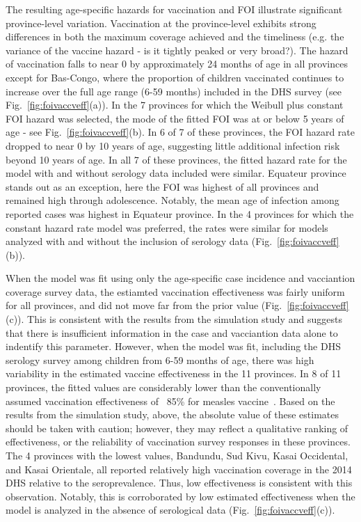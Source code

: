 \documentclass[nofootinbib,aps,pre,twocolumn,superscriptaddress,showkeys,showpacs]{revtex4-1}
\begin{document}
The resulting age-specific hazards for vaccination and FOI illustrate significant province-level variation.  Vaccination at the province-level exhibits strong differences in both the maximum coverage achieved and the timeliness (e.g. the variance of the vaccine hazard - is it tightly peaked or very broad?).  The hazard of vaccination falls to near 0 by approximately 24 months of age in all provinces except for Bas-Congo, where the proportion of children vaccinated continues to increase over the full age range (6-59 months) included in the DHS survey (see Fig.~\ref{fig:foivaccveff}(a)). In the 7 provinces for which the Weibull plus constant FOI hazard was selected, the mode of the fitted FOI was at or below 5 years of age - see Fig.~\ref{fig:foivaccveff}(b).  In 6 of 7 of these provinces, the FOI hazard rate dropped to near 0 by 10 years of age, suggesting little additional infection risk beyond 10 years of age.  In all 7 of these provinces, the fitted hazard rate for the model with and without serology data included were similar.  Equateur province stands out as an exception, here the FOI was highest of all provinces and remained high through adolescence. Notably, the mean age of infection among reported cases was highest in Equateur province. In the 4 provinces for which the constant hazard rate model was preferred, the rates were similar for models analyzed with and without the inclusion of serology data (Fig.~\ref{fig:foivaccveff}(b)).

When the model was fit using only the age-specific case incidence and vacciantion coverage survey data, the estiamted vaccination effectiveness was fairly uniform for all provinces, and did not move far from the prior value (Fig.~\ref{fig:foivaccveff}(c)).  This is consistent with the results from the simulation study and suggests that there is insufficient information in the case and vacciantion data alone to indentify this parameter.  However, when the model was fit, including the DHS serology survey among children from 6-59 months of age, there was high variability in the estimated vaccine effectiveness in the 11 provinces.  In 8 of 11 provinces, the fitted values are considerably lower than the conventionally assumed vaccination effectiveness of ~85\% for measles vaccine~\cite{Uzicanin2011}. Based on the results from the simulation study, above, the absolute value of these estimates should be taken with caution; however, they may reflect a qualitative ranking of effectiveness, or the reliability of vaccination survey responses in these provinces.  The 4 provinces with the lowest values, Bandundu, Sud Kivu, Kasai Occidental, and Kasai Orientale, all reported relatively high vaccination coverage in the 2014 DHS relative to the seroprevalence.  Thus, low effectiveness is consistent with this observation.  Notably, this is corroborated by low estimated effectiveness when the model is analyzed in the absence of serological data  (Fig.~\ref{fig:foivaccveff}(c)).
\end{document}
